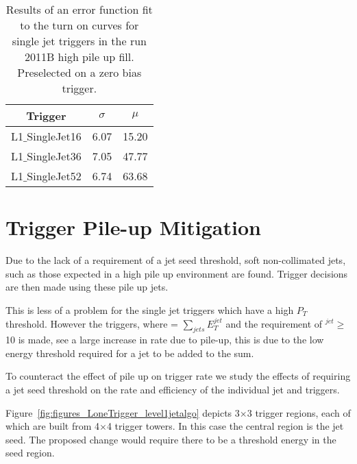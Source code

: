 \begin{table}[ht]
\begin{tabular}{|c|c|c|}
\hline
Trigger & $\sigma$ & $\mu$\\
\hline
L1$\_$SingleJet16 & 6.07 & 15.20 \\
\hline
L1$\_$SingleJet36 & 7.05 & 47.77 \\
\hline
L1$\_$SingleJet52 & 6.74 & 63.68 \\
\hline
\end{tabular}
\caption{Results of an error function fit to the turn on curves for \Lone 
single jet triggers in the run 2011B high pile up fill. Preselected on a zero
bias trigger.}
\label{tab:2011B_HighPU_NoFastJet}
\end{table}
























\section{\Lone Trigger Pile-up Mitigation} %
\label{sub:lone_trigger_pile_up_mitigation}
Due to the lack of a requirement of a jet seed threshold, soft non-collimated 
jets, such as those expected in a high pile up environment are found. Trigger 
decisions are then made using these pile up jets.

This is less of a problem for the single jet triggers which have a high $P_{T}$ 
threshold. However the \HT triggers, where \HT = $\sum_{jets}E_{T}^{jet}$ and 
the requirement of \ET$^{jet} \geq $10 \GeV is made, see a large increase in 
rate due to pile-up, this is due to the low energy  threshold required for a 
jet to be added to the \HT sum.

To counteract the effect of pile up on trigger rate we study the effects of 
requiring a jet seed threshold on the rate and efficiency of the individual jet 
and \HT triggers.

Figure~\ref{fig:figures_LoneTrigger_level1jetalgo} depicts 3$\times$3 trigger
regions, each of which are built from 4$\times$4 trigger towers. In this case 
the central region is the jet seed. The proposed change would require there to 
be a threshold energy in the seed region.

